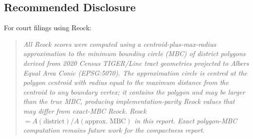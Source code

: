 \subsection{Recommended Disclosure}

For court filings using Reock:
\begin{quote}
  \emph{All Reock scores were computed using a centroid-plus-max-radius approximation
  to the minimum bounding circle (MBC) of district polygons derived from 2020 Census
  TIGER/Line tract geometries projected to Albers Equal Area Conic (EPSG:5070).
  The approximation circle is centred at the polygon centroid with radius equal to the
  maximum distance from the centroid to any boundary vertex; it contains the polygon
  and may be larger than the true MBC, producing implementation-parity Reock
  values that may differ from exact-MBC Reock. Reock
  $= A(\text{district})/A(\text{approx.\ MBC})$ in this report.
  Exact polygon-MBC computation remains future work for the compactness report.}
\end{quote}
